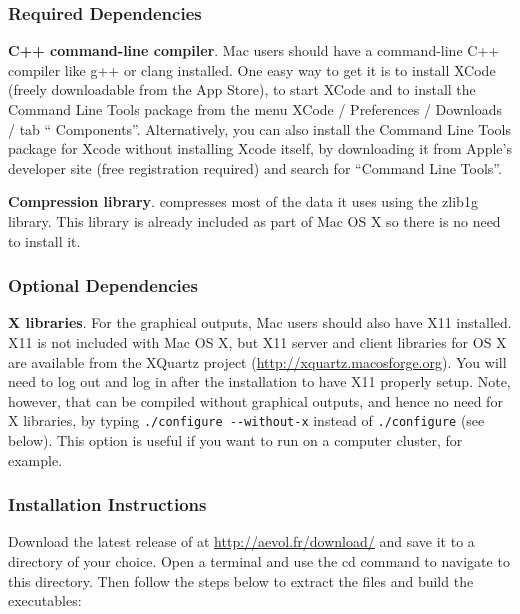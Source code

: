 \subsubsection{Required Dependencies}
\begin{myList} 
\item \textbf{C++ command-line compiler}. Mac users should have a  command-line C++ compiler like g++ or clang installed. One easy way to get it is to install XCode (freely downloadable from the App Store), to start XCode and to install the Command Line Tools package from the menu XCode / Preferences / Downloads / tab `` Components''. Alternatively, you can also install the Command Line Tools package for Xcode without installing Xcode itself, by downloading it from Apple's developer site (free registration required) and search for ``Command Line Tools''.
\item \textbf{Compression library}. \aevol{} compresses most of the data it uses using the zlib1g library. This library is already included as part of Mac OS X so there is no need to install it. 
\end{myList}
\subsubsection{Optional Dependencies}
\begin{myList} 
\item \textbf{X libraries}. For the graphical outputs, Mac users should also have X11 installed. X11 is not included with Mac OS X, but X11 server and client libraries for OS X are available from the XQuartz project (\url{http://xquartz.macosforge.org}). You will need to log out and log in after the installation to have X11 properly setup. Note, however, that \aevol{} can be compiled without graphical outputs, and hence no need for X libraries, by typing  \verb?./configure --without-x?  instead of  \verb?./configure?  (see below). This option is useful if you want to run \aevol{} on a computer cluster, for example.
\end{myList}

\subsubsection{Installation Instructions}
Download the latest release of \aevol{} at \url{http://aevol.fr/download/} and save it to a directory of your choice.
Open a terminal and use the cd command to navigate to this directory.
Then follow the steps below to extract the files and build the executables:

